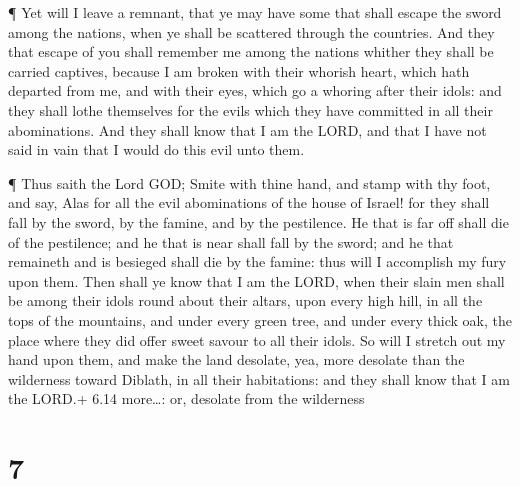 ¶ Yet will I leave a remnant, that ye may have some that
shall escape the sword among the nations, when ye shall be scattered
through the countries.  And they that escape of you shall
remember me among the nations whither they shall be carried captives,
because I am broken with their whorish heart, which hath departed from
me, and with their eyes, which go a whoring after their idols: and they
shall lothe themselves for the evils which they have committed in all
their abominations.  And they shall know that I am the
LORD, and that I have not said in vain that I would do this evil unto
them.

 ¶ Thus saith the Lord GOD; Smite with thine hand, and
stamp with thy foot, and say, Alas for all the evil abominations of the
house of Israel! for they shall fall by the sword, by the famine, and by
the pestilence.  He that is far off shall die of the
pestilence; and he that is near shall fall by the sword; and he that
remaineth and is besieged shall die by the famine: thus will I
accomplish my fury upon them.  Then shall ye know that I am
the LORD, when their slain men shall be among their idols round about
their altars, upon every high hill, in all the tops of the mountains,
and under every green tree, and under every thick oak, the place where
they did offer sweet savour to all their idols.  So will I
stretch out my hand upon them, and make the land desolate, yea, more
desolate than the wilderness toward Diblath, in all their habitations:
and they shall know that I am the LORD.+ 6.14 more\ldots: or, desolate
from the wilderness

\hypertarget{section-6}{%
\section{7}\label{section-6}}

